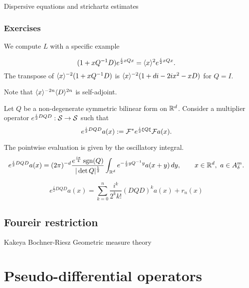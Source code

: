 \documentclass{../../large}
\begin{document}
\begin{prb}
	
\end{prb}
Dispersive equations and strichartz estimates

\section*{Exercises}
\begin{prb}
We compute $L$ with a specific example
\end{prb}
\begin{pf}
\[(1+xQ^{-1}D)e^{\frac i2xQx}=\langle x\rangle^2e^{\frac i2xQx}.\]
The transpose of $\langle x\rangle^{-2}(1+xQ^{-1}D)$ is $\langle x\rangle^{-2}(1+di-2ix^2-xD)$ for $Q=I$.

Note that $\langle x\rangle^{-2n}\langle D\rangle^{2n}$ is self-adjoint.

Let $Q$ be a non-degenerate symmetric bilinear form on $\mathbb{R}^d$.
Consider a multiplier operator $e^{\frac i2DQD}:\mathcal{S}\to\mathcal{S}$ such that
\[e^{\frac i2DQD}a(x):=\mathcal{F}^*e^{\frac i2\xi Q\xi}\mathcal{F} a(x).\]
\begin{parts}
\item
The pointwise evaluation is given by the oscillatory integral.
\[e^{\frac i2DQD}a(x)=(2\pi)^{-d}\frac{e^{\frac{i\pi}4}\operatorname{sgn}(Q)}{|\det Q|^{\frac12}}\int_{\mathbb{R}^d}e^{-\frac i2yQ^{-1}y}a(x+y)\,dy,\qquad x\in\mathbb{R}^d,\ a\in A_\delta^m.\]
\item
\[e^{\frac i2DQD}a(x)=\sum_{k=0}^n\frac{i^k}{2^kk!}(DQD)^ka(x)+r_n(x)\]
\end{parts}
\end{pf}


\chapter{Foureir restriction}
Kakeya
Bochner-Riesz
Geometric measure theory

\chapter{}









\part{Pseudo-differential operators}
\end{document}
